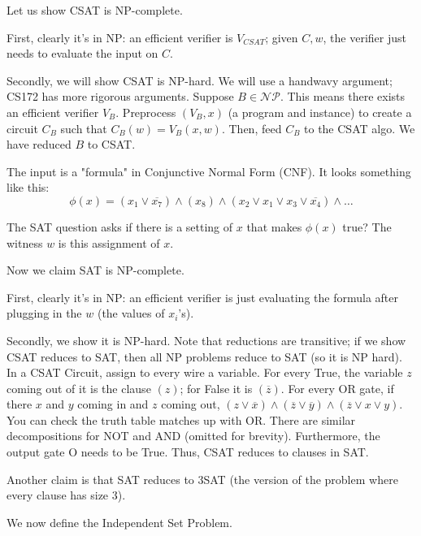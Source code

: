 Let us show CSAT is NP-complete.
\begin{proof*}
    First, clearly it's in NP:
    an efficient verifier is $V_{CSAT}$; given $C, w$, the verifier just needs to evaluate the input on $C$.
    
    Secondly, we will show CSAT is NP-hard. We will use a handwavy argument; CS172 has more rigorous arguments.
    Suppose $B \in \mathcal{NP}$. This means there exists an efficient verifier $V_B$. Preprocess $(V_B, x)$ (a program and instance) to
    create a circuit $C_B$ such that $C_B(w) = V_B(x, w)$. Then, feed $C_B$ to the CSAT algo. We have reduced $B$ to CSAT.
\end{proof*}

\begin{definition}[SAT]
    The input is a "formula" in Conjunctive Normal Form (CNF). It looks something like this:
    \[ \phi(x) = (x_1 \lor \overline{x_7}) \land (x_8) \land (x_2 \lor x_1 \lor x_3 \lor \overline{x_4}) \land \dots \]
    
    The SAT question asks if there is a setting of $x$ that makes $\phi(x)$ true? The witness $w$ is this assignment of $x$.
\end{definition}

Now we claim SAT is NP-complete.

\begin{proof*}
    First, clearly it's in NP: an efficient verifier is just evaluating the formula after plugging in the $w$ (the values of $x_i$'s).

    Secondly, we show it is NP-hard. Note that reductions are transitive; if we show CSAT reduces to SAT, then all NP problems reduce to SAT (so it is NP hard).
    In a CSAT Circuit, assign to every wire a variable. For every True, the variable $z$ coming out of it is the clause $(z)$; for False it is $(\overline{z})$.
    For every OR gate, if there $x$ and $y$ coming in and $z$ coming out, $(z \lor \overline{x}) \land (\overline{z} \lor \overline{y}) \land (\overline{z} \lor x \lor y)$. You can check the truth
    table matches up with OR. There are similar decompositions for NOT and AND (omitted for brevity). Furthermore, the output gate O needs to be True. Thus, CSAT reduces to clauses in SAT.
\end{proof*}

Another claim is that SAT reduces to 3SAT (the version of the problem where every clause has size 3).

We now define the Independent Set Problem.

